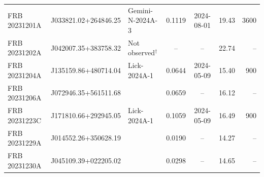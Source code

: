 \begin{tabular}{lllccrr}
 FRB 20231201A & J033821.02+264846.25 & Gemini-N-2024A-3 & 0.1119 & 2024-08-01      &      19.43 &          3600 \\
 FRB 20231202A & J042007.35+383758.32 & Not observed$^\dagger$        &         -- &              -- &      22.74 &            -- \\
 FRB 20231204A & J135159.86+480714.04 & Lick-2024A-1 &     0.0644 & 2024-05-09      &      15.40  &          900 \\
 FRB 20231206A & J072946.35+561511.68 & \citet{rines2000infall} & 0.0659 & -- & 16.12 & -- \\ 
 FRB 20231223C & J171810.66+292945.05 & Lick-2024A-1 & 0.1059 & 2024-05-09     &      16.49 & 900 \\
 FRB 20231229A & J014552.26+350628.19 & \citet{yu2022statistical} & 0.0190 & -- & 14.27 & -- \\
 FRB 20231230A & J045109.39+022205.02 & \citet{rines2003cairns}   & 0.0298 & -- & 14.65 & -- \\
\hline
\end{tabular}